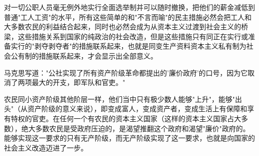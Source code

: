 对一切公职人员毫无例外地实行全面选举制并可以{\kaishu 随时}撤换，把他们的薪金减低到普通"工人工资"的水平，所有这些简单的和"不言而喻"的民主措施必然会把工人和大多数农民的利益结合起来，同时也必然会成为从资本主义过渡到社会主义的桥梁，这些措施关系到国家的纯政治的社会改造，但是这些措施只有同正在实行或准备实行的"剥夺剥夺者"的措施联系起来，也就是同变生产资料资本主义私有制为社会公有制的措施联系起来，才会显示出全部意义。

\pskip
\leftskip=10mm
\small

马克思写道："公社实现了所有资产阶级革命都提出的'廉价政府'的口号，因为它取消了两项最大的开支，即军队和官吏。"

\normalsize
\leftskip=0mm
\pskip

农民同小资产阶级其他阶层一样，他们当中只有极少数人能够"上升"，能够"出头"（从资产阶级的意义来说），即变成富人，变成资产者，变成生活上有保障和享有特权的官吏。在任何一个有农民的资本主义国家（这样的资本主义国家占大多数），绝大多数农民是受政府压迫的，是渴望推翻这个政府和渴望"廉价"政府的。能够实现这一要求的{\kaishu 只有}无产阶级，而无产阶级实现了这一要求，也就是向国家的社会主义改造迈进了一步。


